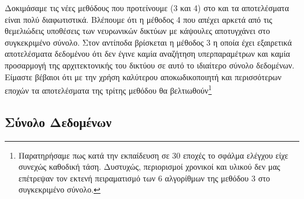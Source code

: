 Δοκιμάσαμε τις νέες μεθόδους που προτείνουμε (3 και 4) στο  και τα αποτελέσματα είναι πολύ διαφωτιστικά. Βλέπουμε ότι η μέθοδος 4 που απέχει αρκετά από τις θεμελιώδεις υποθέσεις των νευρωνικών δικτύων με κάψουλες αποτυγχάνει στο συγκεκριμένο σύνολο. Στον αντίποδα βρίσκεται η μέθοδος 3 η οποία έχει εξαιρετικά αποτελέσματα δεδομένου ότι δεν έγινε καμία αναζήτηση υπερπαραμέτρων και καμία προσαρμογή της αρχιτεκτονικής του δικτύου σε αυτό το ιδιαίτερο σύνολο δεδομένων. Είμαστε βέβαιοι ότι με την χρήση καλύτερου αποκωδικοποιητή και περισσότερων εποχών τα αποτελέσματα της τρίτης μεθόδου θα βελτιωθούν\footnote{Παρατηρήσαμε πως κατά την εκπαίδευση σε 30 εποχές το σφάλμα ελέγχου είχε συνεχώς καθοδική τάση. Δυστυχώς, περιορισμοί χρονικοί και υλικού δεν μας επέτρεψαν τον εκτενή πειραματισμό των 6 αλγορίθμων της μεθόδου 3 στο συγκεκριμένο σύνολο.}

\subsection{Σύνολο Δεδομένων }

